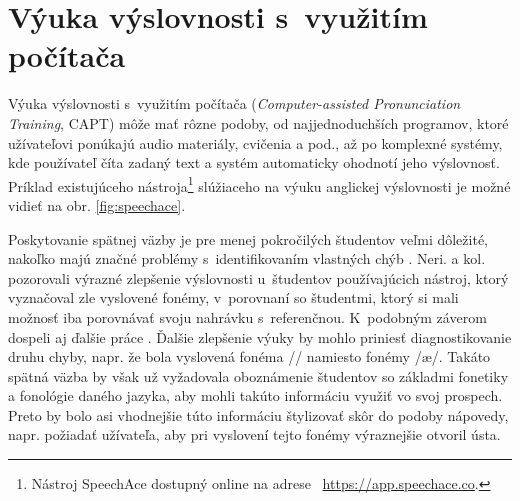     

\section{Výuka výslovnosti s~využitím počítača}

Výuka výslovnosti s~využitím počítača (\textit{Computer-assisted Pronunciation Training}, CAPT) môže mať rôzne podoby, od najjednoduchších programov, ktoré užívateľovi ponúkajú audio materiály, cvičenia a pod., až po komplexné systémy, kde používateľ číta zadaný text a systém automaticky ohodnotí jeho výslovnosť. Príklad existujúceho nástroja\footnote{Nástroj SpeechAce dostupný online na adrese ~\url{https://app.speechace.co}.} slúžiaceho na výuku anglickej výslovnosti je možné vidieť na obr. \ref{fig:speechace}.

\noindent Poskytovanie spätnej väzby je pre menej pokročilých študentov veľmi dôležité, nakoľko majú značné problémy s~identifikovaním vlastných chýb \cite{Dlaska2008}.
Neri. a kol. \cite{Neri2006} pozorovali výrazné zlepšenie výslovnosti u~študentov používajúcich nástroj, ktorý vyznačoval zle vyslovené fonémy, v~porovnaní so študentmi, ktorý si mali možnosť iba porovnávať svoju nahrávku s~referenčnou. K~podobným záverom dospeli aj ďalšie práce \cite{Precoda2000, Tanner2009}. Ďalšie zlepšenie výuky by mohlo priniesť diagnostikovanie druhu chyby, napr. že bola vyslovená fonéma /\textturnv/ namiesto fonémy /\ae/. Takáto spätná väzba by však už vyžadovala oboznámenie študentov so základmi fonetiky a fonológie daného jazyka, aby mohli takúto informáciu využiť vo svoj prospech. Preto by bolo asi vhodnejšie túto informáciu štylizovať skôr do podoby nápovedy, napr. požiadať užívateľa, aby pri vyslovení tejto fonémy výraznejšie otvoril ústa.

